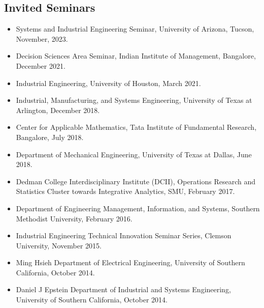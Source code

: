 \documentclass[hyperref, margin]{myResume}
\begin{document}
\begin{resume}
\section{Invited Seminars}
	\begin{itemize}[leftmargin=*]
		\item Systems and Industrial Engineering Seminar, University of Arizona, Tucson, November, 2023.
		\item Decision Sciences Area Seminar, Indian Institute of Management, Bangalore, December 2021.
		\item Industrial Engineering, University of Houston, March 2021.
		\item Industrial, Manufacturing, and Systems Engineering, University of Texas at Arlington, December 2018.
		\item Center for Applicable Mathematics, Tata Institute of Fundamental Research, Bangalore, July 2018.
		\item Department of Mechanical Engineering, University of Texas at Dallas, June 2018.
		\item Dedman College Interdisciplinary Institute (DCII), Operations Research and Statistics Cluster towards Integrative Analytics, SMU, February 2017.
		\item Department of Engineering Management, Information, and Systems, Southern Methodist University, February 2016.
		\item Industrial Engineering Technical Innovation Seminar Series, Clemson University, November 2015.
		\item Ming Hsieh Department of Electrical Engineering, University of Southern California, October 2014.
		\item Daniel J Epstein Department of Industrial and Systems Engineering, University of Southern California, October 2014.
	\end{itemize}


\end{resume}
\end{document}
